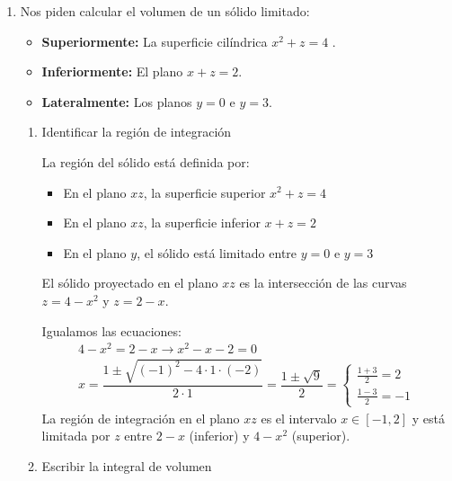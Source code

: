 \begin{enumerate}[label=\color{red}\textbf{\arabic*)}, leftmargin=*]
\item {}

  Nos piden calcular el volumen de un sólido limitado:
  \begin{itemize}[label=\textbullet]
    \item \textbf{Superiormente:} La superficie cilíndrica $x^2+z=4$ .
    \item \textbf{Inferiormente:} El plano $x+z=2$.
  \item \textbf{Lateralmente:}  Los planos $y=0$ e  $y=3$.
  \end{itemize}
    \begin{enumerate}[label=Paso \arabic*:]
      \item Identificar la región de integración

        La región del sólido está definida por:
        \begin{itemize}[label=\textbullet]
          \item En el plano $xz$, la superficie superior $x^2+z=4$
          \item En el plano $xz$, la superficie inferior  $x+z=2$
          \item En el plano  $y$, el sólido está limitado entre  $y=0$ e  $y=3$
        \end{itemize}

        El sólido proyectado en el plano $xz$ es la intersección de las curvas $z=4-x^2$ y $z=2-x$.
        
        Igualamos las ecuaciones:  \[
        \begin{array}{c}
          4-x^2=2-x\longrightarrow x^2-x-2=0\\
          x=\dfrac{1\pm\sqrt{(-1)^2-4\cdot 1\cdot (-2)} }{2\cdot 1}=\dfrac{1\pm\sqrt{9} }{2} =\begin{cases}
            \frac{1+3}{2} =2\\
            \frac{1-3}{2} =-1
          \end{cases} 
        \end{array}
        \] 
        La región de integración en el plano $xz$ es el intervalo  $x \in [-1,2]$ y está limitada por $z$ entre  $2-x$ (inferior) y  $4-x^2$ (superior).
      \item  Escribir la integral de volumen


\end{enumerate}
\end{enumerate}
